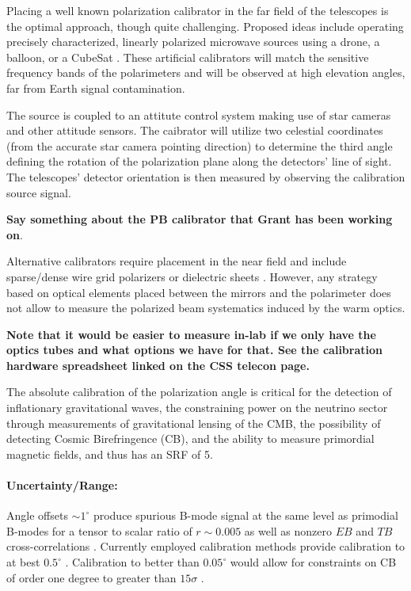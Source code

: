 Placing a well known polarization calibrator in the far field of the telescopes
is the optimal approach, though quite challenging. Proposed ideas include
operating precisely characterized, linearly polarized microwave sources using a
drone, a balloon, or a CubeSat \cite{nati2017, Johnson2015}. These artificial
calibrators will match the sensitive frequency bands of the polarimeters and
will be observed at high elevation angles, far from Earth signal contamination.

The source is coupled to an attitute control system making use of star cameras
and other attitude sensors. The caibrator will utilize two celestial
coordinates (from the accurate star camera pointing direction) to determine the
third angle defining the rotation of the polarization plane along the
detectors' line of sight. The telescopes' detector orientation is then measured
by observing the calibration source signal. 

\textbf{Say something about the PB calibrator that Grant has been working on}.


Alternative calibrators require placement in the near field and include
sparse/dense wire grid polarizers or dielectric sheets \cite{Takahashi2010,
2016arXiv160701825K}.  However, any strategy based on optical elements placed
between the mirrors and the polarimeter does not allow to measure the polarized
beam systematics induced by the warm optics. 

\textbf{Note that it would be easier to measure in-lab if we only have the
optics tubes and what options we have for that. See the calibration hardware
spreadsheet linked on the CSS telecon page.}

The absolute calibration of the polarization angle is critical for the
detection of inflationary gravitational waves, the constraining power on the
neutrino sector through measurements of gravitational lensing of the CMB, the
possibility of detecting Cosmic Birefringence (CB), and the ability to measure
primordial magnetic fields, and thus has an SRF of 5.

\paragraph{Uncertainty/Range:}

Angle offsets $\sim 1^{\circ}$ produce spurious B-mode signal at the same level
as primodial B-modes for a tensor to scalar ratio of $r \sim 0.005$ as well as
nonzero $EB$ and $TB$ cross-correlations \cite{doi:10.1142/S0218271816400125}.
Currently employed calibration methods provide calibration to at
best $0.5^{\circ}$ \cite{2016MNRAS.455.1981K}.
Calibration to better than $0.05^{\circ}$ would allow for constraints on CB of
order one degree to greater than $15\sigma$ \cite{2016MNRAS.455.1981K}.

